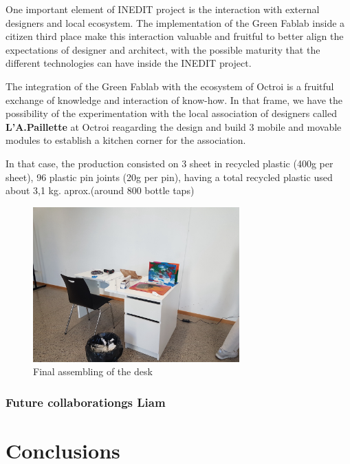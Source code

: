\documentclass[
  11pt,
]{article}
\begin{document}
One important element of INEDIT project is the interaction with external
designers and local ecosystem. The implementation of the Green Fablab
inside a citizen third place make this interaction valuable and fruitful
to better align the expectations of designer and architect, with the
possible maturity that the different technologies can have inside the
INEDIT project.

The integration of the Green Fablab with the ecosystem of Octroi is a
fruitful exchange of knowledge and interaction of know-how. In that
frame, we have the possibility of the experimentation with the local
association of designers called \textbf{L'A.Paillette} at Octroi
reagarding the design and build 3 mobile and movable modules to
establish a kitchen corner for the association.

In that case, the production consisted on 3 sheet in recycled plastic
(400g per sheet), 96 plastic pin joints (20g per pin), having a total
recycled plastic used about 3,1 kg. aprox.(around 800 bottle taps)

\begin{figure}[H]

{\centering \includegraphics[width=3.125in,height=\textheight]{figures/demos/desk/desk-04.jpg}

}

\caption{\label{fig-desk-04}Final assembling of the desk}

\end{figure}

\hypertarget{future-collaborationgs-liam}{%
\subsubsection{Future collaborationgs
Liam}\label{future-collaborationgs-liam}}

\newpage

\hypertarget{conclusions}{%
\section{Conclusions}\label{conclusions}}
\end{document}
